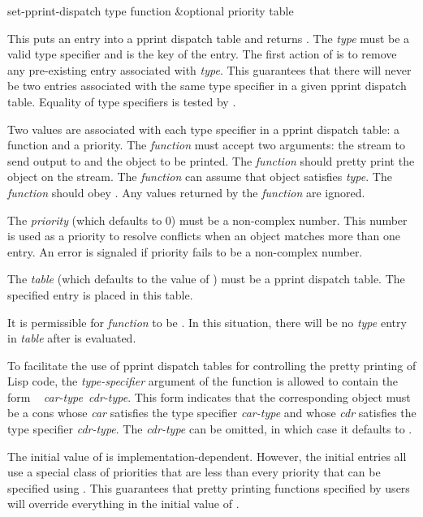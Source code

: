 \begin{defun}[Function]
set-pprint-dispatch type function &optional priority table 

This puts an entry into a pprint dispatch table and returns .  The {\it
type} must be a valid type specifier and is the key of the entry.
The first action of  is to remove any pre-existing
entry associated with {\it type}.  This guarantees that there
will never be two entries associated with the same type specifier in a
given pprint dispatch table.  Equality of type specifiers is tested by
.

Two values are associated with each type specifier in a pprint dispatch
table: a function and a priority.  The {\it function} must accept two
arguments:  the stream to send output to and the object to be printed.
The {\it function} should pretty print the object on the stream.  The {\it
function} can assume that object satisfies {\it type}.  The {\it function}
should obey .  Any values returned by the {\it function}
are ignored.

The {\it priority} (which defaults to 0) must be a non-complex number.
This number is used as a
priority to resolve conflicts when an object matches more than one entry.  An error
is signaled if priority fails to be a non-complex number.

The {\it table} (which defaults to the value of ) must be a pprint
dispatch table.  The specified entry is placed in this table.

It is permissible for {\it function} to be .  In this situation,
there will be no {\it type} entry in {\it table} after
 is evaluated.

To facilitate the use of pprint dispatch tables for controlling the pretty
printing of Lisp code, the {\it type-specifier} argument of the function
 is allowed to contain the form ~{\it
car-type~cdr-type}\cd{)}.  This form indicates that the corresponding object must be
a cons whose {\it car} satisfies the type specifier {\it car-type} and whose
{\it cdr} satisfies
the type specifier {\it cdr-type}.  The {\it cdr-type} can be omitted, in which case
it defaults to .
\end{defun}

The initial value of  is implementation-dependent.
However, the initial entries all use a special class of priorities that
are less than every priority that can be
specified using .  This guarantees that pretty printing
functions specified by users will override everything in the initial value of
.

